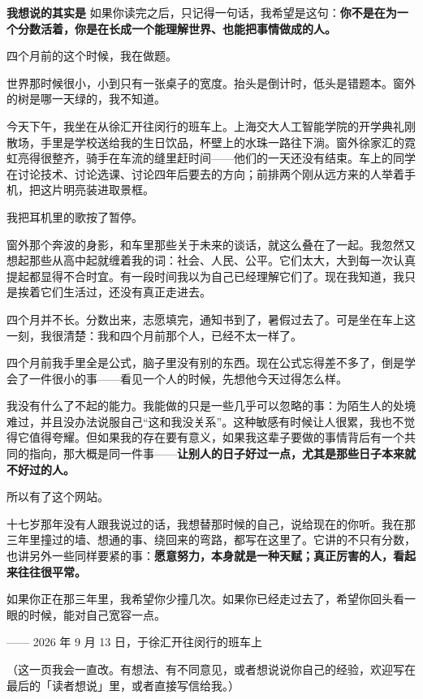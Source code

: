 \documentclass[a4paper,10pt]{article}
\renewcommand{\songti}{\CJKfamily{songpaper}}
\renewcommand{\kaishu}{\songti}
\renewenvironment{quote}
  {\list{}{\leftmargin=1.5em\rightmargin=1em\topsep=2pt\parsep=0pt\itemsep=0pt}\item\relax}
  {\endlist}
\newcommand{\internalheading}[1]{%
  \par\needspace{2.5\baselineskip}\vspace{0.35\baselineskip}%
  \noindent{\bfseries #1}\par\vspace{0.08\baselineskip}}
\begin{document}
\begin{quote}
\kaishu
\noindent\textbf{我想说的其实是}\quad
如果你读完之后，只记得一句话，我希望是这句：\textbf{你不是在为一个分数活着，你是在长成一个能理解世界、也能把事情做成的人。}
\end{quote}

\internalheading{写在九月十三日}
四个月前的这个时候，我在做题。

世界那时候很小，小到只有一张桌子的宽度。抬头是倒计时，低头是错题本。窗外的树是哪一天绿的，我不知道。

今天下午，我坐在从徐汇开往闵行的班车上。上海交大人工智能学院的开学典礼刚散场，手里是学校送给我的生日饮品，杯壁上的水珠一路往下淌。窗外徐家汇的霓虹亮得很整齐，骑手在车流的缝里赶时间——他们的一天还没有结束。车上的同学在讨论技术、讨论选课、讨论四年后要去的方向；前排两个刚从远方来的人举着手机，把这片明亮装进取景框。

我把耳机里的歌按了暂停。

窗外那个奔波的身影，和车里那些关于未来的谈话，就这么叠在了一起。我忽然又想起那些从高中起就缠着我的词：社会、人民、公平。它们太大，大到每一次认真提起都显得不合时宜。有一段时间我以为自己已经理解它们了。现在我知道，我只是挨着它们生活过，还没有真正走进去。

四个月并不长。分数出来，志愿填完，通知书到了，暑假过去了。可是坐在车上这一刻，我很清楚：我和四个月前那个人，已经不太一样了。

四个月前我手里全是公式，脑子里没有别的东西。现在公式忘得差不多了，倒是学会了一件很小的事——看见一个人的时候，先想他今天过得怎么样。

我没有什么了不起的能力。我能做的只是一些几乎可以忽略的事：为陌生人的处境难过，并且没办法说服自己“这和我没关系”。这种敏感有时候让人很累，我也不觉得它值得夸耀。但如果我的存在要有意义，如果我这辈子要做的事情背后有一个共同的指向，那大概是同一件事——\textbf{让别人的日子好过一点，尤其是那些日子本来就不好过的人。}

所以有了这个网站。

十七岁那年没有人跟我说过的话，我想替那时候的自己，说给现在的你听。我在那三年里撞过的墙、想通的事、绕回来的弯路，都写在这里了。它讲的不只有分数，也讲另外一些同样要紧的事：\textbf{愿意努力，本身就是一种天赋；真正厉害的人，看起来往往很平常。}

如果你正在那三年里，我希望你少撞几次。如果你已经走过去了，希望你回头看一眼的时候，能对自己宽容一点。

—— 2026 年 9 月 13 日，于徐汇开往闵行的班车上

（这一页我会一直改。有想法、有不同意见，或者想说说你自己的经验，欢迎写在最后的「读者想说」里，或者直接写信给我。）
\end{document}
